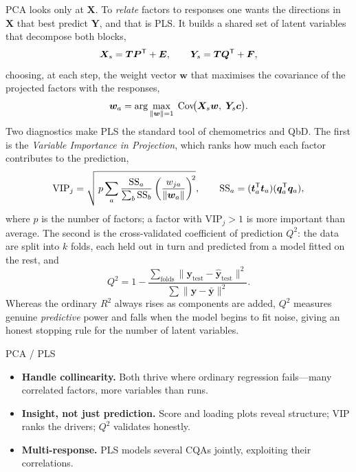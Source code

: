 PCA looks only at $\bm X$. To \emph{relate} factors to responses one wants the
directions in $\bm X$ that best predict $\bm Y$, and that is PLS. It builds a
shared set of latent variables that decompose both blocks,
%
\begin{equation}
\bm X_s = \bm T \bm P^{\mathsf{T}} + \bm E,
\qquad
\bm Y_s = \bm T \bm Q^{\mathsf{T}} + \bm F,
\end{equation}
%
choosing, at each step, the weight vector $\bm w$ that maximises the covariance of
the projected factors with the responses,
%
\begin{equation}
\bm w_a = \arg\max_{\|\bm w\|=1}\;
\operatorname{Cov}\!\bigl(\bm X_s \bm w,\; \bm Y_s \bm c\bigr).
\end{equation}
%
Two diagnostics make PLS the standard tool of chemometrics and QbD. The first is
the \emph{Variable Importance in Projection}, which ranks how much each factor
contributes to the prediction,
%
\begin{equation}
\mathrm{VIP}_j = \sqrt{\,p \sum_{a}
  \frac{\mathrm{SS}_a}{\sum_b \mathrm{SS}_b}
  \left(\frac{w_{ja}}{\|\bm w_a\|}\right)^{\!2}},
\qquad
\mathrm{SS}_a = (\bm t_a^{\mathsf{T}}\bm t_a)(\bm q_a^{\mathsf{T}}\bm q_a),
\label{eq:vip}
\end{equation}
%
where $p$ is the number of factors; a factor with $\mathrm{VIP}_j>1$ is more
important than average. The second is the cross-validated coefficient of
prediction $Q^2$: the data are split into $k$ folds, each held out in turn and
predicted from a model fitted on the rest, and
%
\begin{equation}
Q^2 = 1 - \frac{\sum_{\text{folds}} \|\bm y_{\text{test}}
                 - \hat{\bm y}_{\text{test}}\|^2}
               {\sum \|\bm y - \bar{\bm y}\|^2}.
\end{equation}
%
Whereas the ordinary $R^2$ always rises as components are added, $Q^2$ measures
genuine \emph{predictive} power and falls when the model begins to fit noise,
giving an honest stopping rule for the number of latent variables.

\begin{prosbox}{PCA / PLS}
\begin{itemize}
  \item \textbf{Handle collinearity.} Both thrive where ordinary regression
  fails---many correlated factors, more variables than runs.
  \item \textbf{Insight, not just prediction.} Score and loading plots reveal
  structure; VIP ranks the drivers; $Q^2$ validates honestly.
  \item \textbf{Multi-response.} PLS models several CQAs jointly, exploiting their
  correlations.
\end{itemize}
\end{prosbox}

